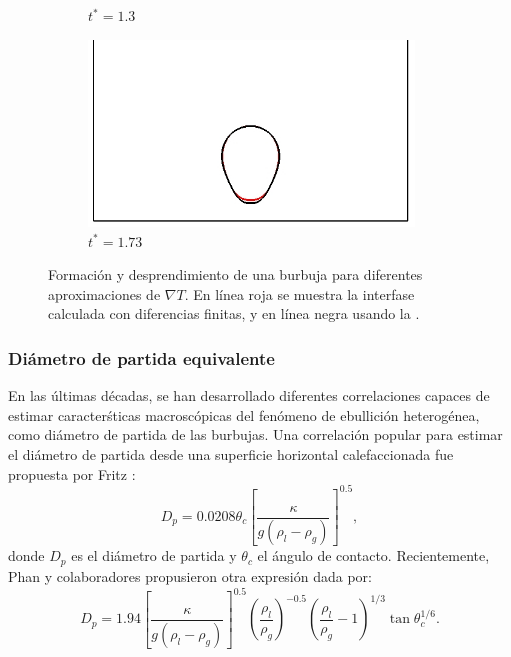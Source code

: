 \begin{figure}[htb]
\begin{subfigure}[t]{0.45\textwidth}
        \caption{$t^*=1.3$}
    \end{subfigure}    
    \begin{subfigure}[t]{0.45\textwidth}
        \centering
        \includegraphics[width=0.95\textwidth]{Imagenes/HetBoiling/gradT/60}
        \caption{$t^*=1.73$}
    \end{subfigure}        
    \caption{Formaci\'on y desprendimiento de una burbuja para diferentes aproximaciones de $\nabla T$. En l\'inea roja se muestra la interfase calculada con diferencias finitas, y en l\'inea negra usando la .}
    \label{fig:bubble2D_gradT}
\end{figure}



\subsubsection{Di\'ametro de partida equivalente}

En las \'ultimas d\'ecadas, se han desarrollado diferentes correlaciones capaces de estimar caracter\'sticas macrosc\'opicas del fen\'omeno de ebullici\'on heterog\'enea, como di\'ametro de partida de las burbujas. Una correlaci\'on popular para estimar el di\'ametro de partida desde una superficie horizontal calefaccionada fue propuesta por Fritz \cite{fritz_berechnung_1935}:
\begin{equation}
	D_p = 0.0208 \theta_c \left[ \dfrac{\kappa}{g(\rho_l-\rho_g)} \right]^{0.5},
	\label{eq:g_fritz}
\end{equation}
donde $D_p$ es el di\'ametro de partida y $\theta_c$ el \'angulo de contacto. Recientemente, Phan y colaboradores propusieron otra expresi\'on dada por:
\begin{equation}
	D_p = 1.94 \left[ \dfrac{\kappa}{g(\rho_l-\rho_g)} \right]^{0.5} \left( \dfrac{\rho_l}{\rho_g} \right)^{-0.5} \left( \dfrac{\rho_l}{\rho_g} -1\right)^{1/3} \tan\theta_c^{1/6}.
	\label{eq:g_phan}
\end{equation}

